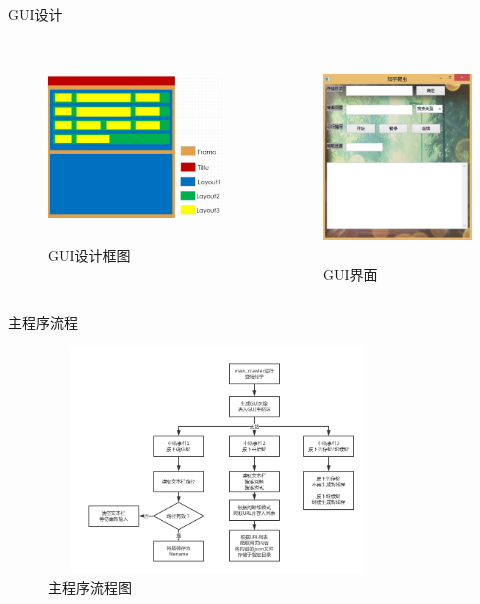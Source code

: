 \documentclass[aspectratio=169]{beamer}
\begin{document}
\begin{frame}{GUI设计}
\begin{columns}
\column{8cm}
\begin{figure}
  \centering
  \includegraphics[width=7cm,height=5cm]{GUI设计}
  \caption{GUI设计框图}
\end{figure}

\column{7cm}
\begin{figure}
  \centering
  \includegraphics[width=6cm,height=5.5cm]{GUI界面}
  \caption{GUI界面}
\end{figure}
\end{columns}
\end{frame}

\begin{frame}{主程序流程}
\begin{figure}
  \centering
  \includegraphics[width=9cm,height=6cm]{主程序流程图}
  \caption{主程序流程图}
\end{figure}
\end{frame}
\end{document}
